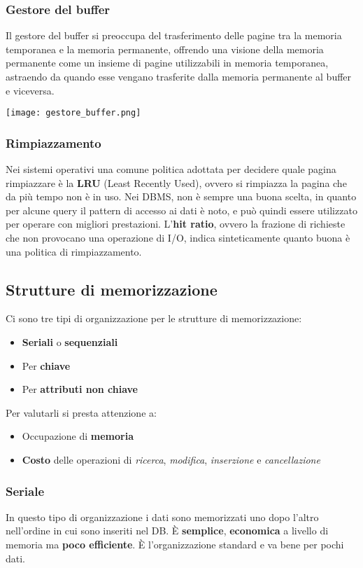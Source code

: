 \subsubsection{Gestore del buffer}
Il gestore del buffer si preoccupa del trasferimento delle pagine tra la memoria temporanea e la memoria permanente, offrendo una visione della memoria permanente come un insieme di pagine utilizzabili in memoria temporanea, astraendo da quando esse vengano trasferite dalla memoria permanente al buffer e viceversa.

\begin{center}
	\texttt{[image: gestore\_buffer.png]}
\end{center}

\subsubsection{Rimpiazzamento}
Nei sistemi operativi una comune politica adottata per decidere quale pagina rimpiazzare è la \textbf{LRU} (Least Recently Used), ovvero si rimpiazza la pagina che da più tempo non è in uso. Nei DBMS, non è sempre una buona scelta, in quanto per alcune query il pattern di accesso ai dati è noto, e può quindi essere utilizzato per operare con migliori prestazioni. L’\textbf{hit ratio}, ovvero la frazione di richieste che non provocano una operazione di I/O, indica sinteticamente quanto buona è una politica di rimpiazzamento.

\subsection{Strutture di memorizzazione}
Ci sono tre tipi di organizzazione per le strutture di memorizzazione:
\begin{itemize}
	\item \textbf{Seriali} o \textbf{sequenziali}
	\item Per \textbf{chiave}
	\item Per \textbf{attributi non chiave}
\end{itemize}
Per valutarli si presta attenzione a:
\begin{itemize}
	\item Occupazione di \textbf{memoria}
	\item \textbf{Costo} delle operazioni di \textit{ricerca}, \textit{modifica}, \textit{inserzione} e \textit{cancellazione}
\end{itemize}

\subsubsection{Seriale}
In questo tipo di organizzazione i dati sono memorizzati uno dopo l'altro nell'ordine in cui sono inseriti nel DB. È \textbf{semplice}, \textbf{economica} a livello di memoria ma \textbf{poco efficiente}. È l'organizzazione standard e va bene per pochi dati.

